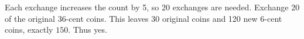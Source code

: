 Each exchange increases the count by 5, so 20 exchanges are needed. Exchange 20 of the original 36-cent coins. This leaves 30 original coins and 120 new 6-cent coins, exactly $\boxed{150}$. Thus yes.

